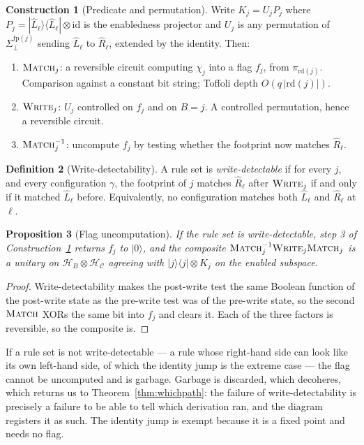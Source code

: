 \documentclass[11pt]{article}
\theoremstyle{definition}
\newtheorem{definition}{Definition}[section]
\newtheorem{construction}[definition]{Construction}
\theoremstyle{plain}
\newtheorem{proposition}[definition]{Proposition}
\newcommand{\Tags}{\Sigma}
\newcommand{\Tagsb}{\Tags_{\bot}}
\newcommand{\Cfg}{\mathcal{C}}
\newcommand{\Hs}{\mathcal{H}}
\newcommand{\Hc}{\Hs_{\Cfg}}
\newcommand{\Hb}{\Hs_{B}}
\newcommand{\fp}{\mathrm{fp}}
\newcommand{\MATCH}{\textsc{Match}}
\newcommand{\WRITE}{\textsc{Write}}
\newcommand{\id}{\mathrm{id}}
\newcommand{\ket}[1]{| #1 \rangle}
\newcommand{\ketbra}[2]{| #1 \rangle\langle #2 |}
\begin{document}
\begin{construction}[Predicate and permutation]\label{con:predperm}\rm
Write $K_j = U_j P_j$ where $P_j = \ketbra{\hat{L}_\ell}{\hat{L}_\ell}\otimes\id$ is the
enabledness projector and $U_j$ is any permutation of $\Tagsb^{\fp(j)}$ sending $\hat{L}_\ell$ to
$\hat{R}_\ell$, extended by the identity. Then:
\begin{enumerate}[leftmargin=2em,label=\arabic*.]
  \item $\MATCH_j$: a reversible circuit computing $\chi_j$ into a flag $f_j$, from
        $\pi_{\mathrm{rd}(j)}$. Comparison against a constant bit string; Toffoli depth
        $O(q\,|\mathrm{rd}(j)|)$.
  \item $\WRITE_j$: $U_j$ controlled on $f_j$ and on $B=j$. A controlled permutation, hence a
        reversible circuit.
  \item $\MATCH_j^{-1}$: uncompute $f_j$ by testing whether the footprint now matches
        $\hat{R}_\ell$.
\end{enumerate}
\end{construction}

\begin{definition}[Write-detectability]\label{def:writedetect}
A rule set is \emph{write-detectable} if for every $j$, and every configuration $\gamma$, the
footprint of $j$ matches $\hat{R}_\ell$ after $\WRITE_j$ if and only if it matched
$\hat{L}_\ell$ before. Equivalently, no configuration matches both $\hat{L}_\ell$ and
$\hat{R}_\ell$ at $\ell$.
\end{definition}

\begin{proposition}[Flag uncomputation]\label{prop:flag}
If the rule set is write-detectable, step 3 of Construction~\ref{con:predperm} returns $f_j$ to
$\ket{0}$, and the composite $\MATCH_j^{-1}\WRITE_j\MATCH_j$ is a unitary on
$\Hb\otimes\Hc$ agreeing with $\ketbra{j}{j}\otimes K_j$ on the enabled subspace.
\end{proposition}

\begin{proof}
Write-detectability makes the post-write test the same Boolean function of the post-write state
as the pre-write test was of the pre-write state, so the second $\MATCH$ XORs the same bit into
$f_j$ and clears it. Each of the three factors is reversible, so the composite is.
\end{proof}

If a rule set is not write-detectable --- a rule whose right-hand side can look like its own
left-hand side, of which the identity jump is the extreme case --- the flag cannot be uncomputed
and is garbage. Garbage is discarded, which decoheres, which returns us to
Theorem~\ref{thm:whichpath}: the failure of write-detectability is precisely a failure to be able
to tell which derivation ran, and the diagram registers it as such. The identity jump is exempt
because it is a fixed point and needs no flag.
\end{document}
